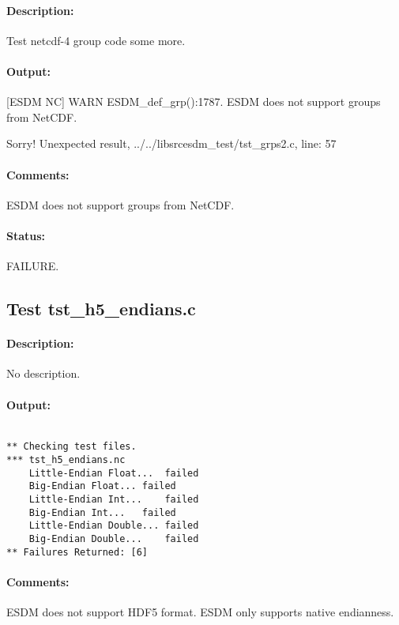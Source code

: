 \paragraph{Description:} Test netcdf-4 group code some more.

\paragraph{Output:} [ESDM NC] WARN ESDM\_def\_grp():1787. ESDM does not support groups from NetCDF.

Sorry! Unexpected result, ../../libsrcesdm\_test/tst\_grps2.c, line: 57

\paragraph{Comments:} ESDM does not support groups from NetCDF.

\paragraph{Status:} FAILURE.

\subsection{Test tst\_h5\_endians.c}

\paragraph{Description:} No description.

\paragraph{Output:}

\begin{verbatim}

** Checking test files.
*** tst_h5_endians.nc
	Little-Endian Float...	failed
	Big-Endian Float...	failed
	Little-Endian Int...	failed
	Big-Endian Int...	failed
	Little-Endian Double...	failed
	Big-Endian Double...	failed
** Failures Returned: [6]

\end{verbatim}

\paragraph{Comments:} ESDM does not support HDF5 format. ESDM only supports native endianness.

